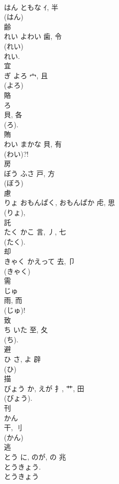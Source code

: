 \documentclass[8pt]{extreport}
\begin{document}
\begin{CJK}{UTF8}{min}
\\	はん	ともな	ｲ, 半	
\\	(はん) 
\\	齢	
\\	れい	よわい	歯, 令	
\\	(れい) 
\\	れい.	
\\	宜	
\\	ぎ	よろ	宀, 且	
\\	(よろ) 
\\	賂	
\\	ろ	
\\	貝, 各	
\\	(ろ). 
\\	賄	
\\	わい	まかな	貝, 有	
\\	(わい)?!
\\	房	
\\	ぼう	ふさ	戸, 方	
\\	(ぼう) 
\\	慮	
\\	りょ	おもんぱく, おもんぱか	虍, 思	
\\	(りょ), 
\\	託	
\\	たく	かこ	言, 丿, 七	
\\	(たく). 
\\	却	
\\	きゃく	かえって	去, 卩	
\\	(きゃく) 
\\	需	
\\	じゅ	
\\	雨, 而	
\\	(じゅ)! 
\\	致	
\\	ち	いた	至, 夂	
\\	(ち).	
\\	避	
\\	ひ	さ, よ	辟		
\\	(ひ) 
\\	描	
\\	びょう	か, えが	扌, 艹, 田	
\\	(びょう). 
\\	刊	
\\	かん	
\\	干, 刂	
\\	(かん) 
\\	逃	
\\	とう	に, のが, の	兆		
\\	とうきょう. 
\\	とうきょう 

\end{CJK}
\end{document}
